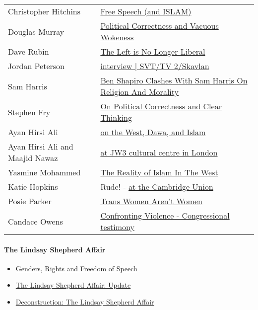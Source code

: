 \documentclass[14pt,titlepage]{extarticle}
\begin{document}
\begin{tabular}{l l}
Christopher Hitchins & \href{https://www.youtube.com/watch?v=4Z2uzEM0ugY}{Free Speech (and ISLAM)}\\
Douglas Murray & \href{https://www.youtube.com/watch?v=m2zZMg7SNWA}{Political Correctness and Vacuous Wokeness}\\
Dave Rubin & \href{https://www.youtube.com/watch?v=Tq86Beh3T70}{The Left is No Longer Liberal}\\
Jordan Peterson & \href{https://www.youtube.com/watch?v=_iudkPi4_sY}{interview | SVT/TV 2/Skavlan}\\
Sam Harris & \href{https://www.youtube.com/watch?v=Nb-o6NZiWrw&t=2001s}{Ben Shapiro Clashes With Sam Harris On Religion And Morality}\\
Stephen Fry & \href{https://www.youtube.com/watch?v=eJQHakkViPo}{On Political Correctness and Clear Thinking}\\
  Ayan Hirsi Ali & \href{https://www.youtube.com/watch?v=Bx2hEc7Dlcg}{on the West, Dawa, and Islam}\\
  Ayan Hirsi Ali and Maajid Nawaz & \href{https://www.youtube.com/watch?v=SV_GMeZ_XmA}{at JW3 cultural centre in London}\\
Yasmine Mohammed & \href{https://www.youtube.com/watch?v=_PXfMY6YqBY}{The Reality of Islam In The West}\\
Katie Hopkins & Rude! - \href{https://www.youtube.com/watch?v=vTo0crpK8Zs}{at the Cambridge Union}\\
Posie Parker & \href{https://www.youtube.com/watch?v=Pdpc2r4cBxQ}{Trans Women Aren't Women}\\
Candace Owens & \href{https://www.youtube.com/watch?v=MFQsjgXyJjk}{Confronting Violence - Congressional testimony}\\

\end{tabular}

\paragraph{The Lindsay Shepherd Affair}

\begin{itemize}
\item \href{https://www.youtube.com/watch?v=kasiov0ytEc&t=2625s}{Genders, Rights and Freedom of Speech}
\item \href{https://www.youtube.com/watch?v=PkNv4LFpGf4}{The Lindsay Shepherd Affair: Update}
\item \href{https://www.youtube.com/watch?v=YWVmDSMl30s}{Deconstruction: The Lindsay Shepherd Affair}
\end{itemize}
\end{document}
